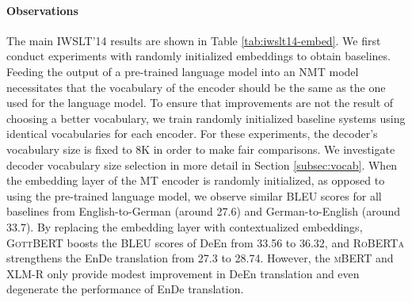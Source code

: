 \documentclass[11pt]{article}
\begin{document}
\paragraph{Observations} 
The main IWSLT'14 results are shown in Table \ref{tab:iwslt14-embed}. We first conduct experiments with randomly initialized embeddings to obtain baselines. Feeding the output of a pre-trained language model into an NMT model necessitates that the vocabulary of the encoder should be the same as the one used for the language model. To ensure that improvements are not the result of choosing a better vocabulary, we train randomly initialized baseline systems using identical vocabularies for each encoder. For these experiments, the decoder's vocabulary size is fixed to 8K in order to make fair comparisons. We investigate decoder vocabulary size selection in more detail in Section \ref{subsec:vocab}. When the embedding layer of the MT encoder is randomly initialized, as opposed to using the pre-trained language model, we observe similar BLEU scores for all baselines from English-to-German (around 27.6) and German-to-English (around 33.7). By replacing the embedding layer with contextualized embeddings, \textsc{GottBERT} boosts the BLEU scores of DeEn from 33.56 to 36.32, and \textsc{RoBERTa} strengthens the EnDe translation from 27.3 to 28.74. However, the \textsc{mBERT} and \textsc{XLM-R} only provide modest improvement in DeEn translation and even degenerate the performance of EnDe translation.
\end{document}
